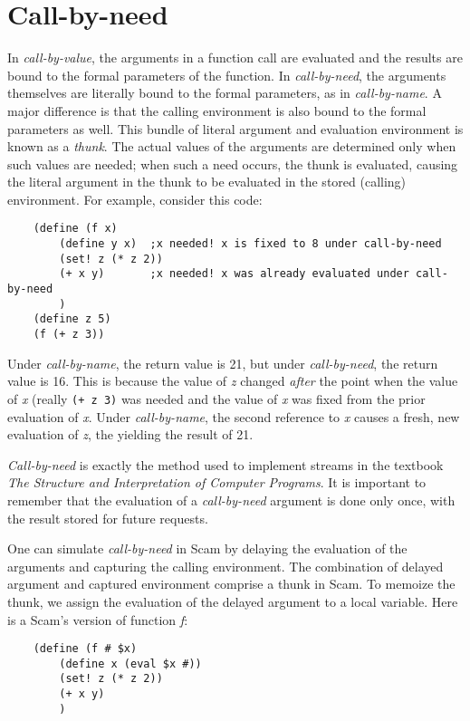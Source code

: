 \section*{Call-by-need}

In {\it call-by-value}, the arguments in a function call are evaluated and
the results are bound to the formal parameters of the function. In
{\it call-by-need}, the arguments themselves are literally bound
to the formal
parameters, as in {\it call-by-name}. A major difference is
that the calling environment is also bound to the formal
parameters as well. This bundle of literal argument and 
evaluation environment is known as a {\it thunk}.
The actual values of the arguments
are determined only when such values are
needed; when such a need occurs, the thunk is
evaluated, causing the literal argument
in the thunk to be
evaluated in the stored (calling) environment.
For example, consider this code:

\begin{verbatim}
    (define (f x)
        (define y x)  ;x needed! x is fixed to 8 under call-by-need
        (set! z (* z 2))
        (+ x y)       ;x needed! x was already evaluated under call-by-need
        )
    (define z 5)
    (f (+ z 3)) 
\end{verbatim}

Under {\it call-by-name}, the return value is 21, but under
{\it call-by-need}, the return value is 16.
This is because the
value of {\it z} changed {\it after} the point when the value of {\it x}
(really \verb!(+ z 3)! was needed and the value of {\it x} was fixed from
the prior evaluation of {\it x}. Under {\it call-by-name}, the second
reference to {\it x} causes a fresh, new evaluation of {\it z},
the yielding the result of 21.

{\it Call-by-need}
is exactly the method used to implement streams in the 
textbook
{\it The Structure and Interpretation of Computer Programs}.
It is important to remember that the evaluation of a
{\it call-by-need} argument is done only once, 
with the result stored for future requests.

One can simulate {\it call-by-need} in Scam by delaying the
evaluation of the arguments and capturing the calling
environment. The combination of delayed argument and
captured environment comprise a thunk in Scam. To memoize
the thunk, we assign the evaluation of the delayed argument
to a local variable. Here is a Scam's version of function {\it f}:

\begin{verbatim}
    (define (f # $x)
        (define x (eval $x #))
        (set! z (* z 2))
        (+ x y)
        )
\end{verbatim}


